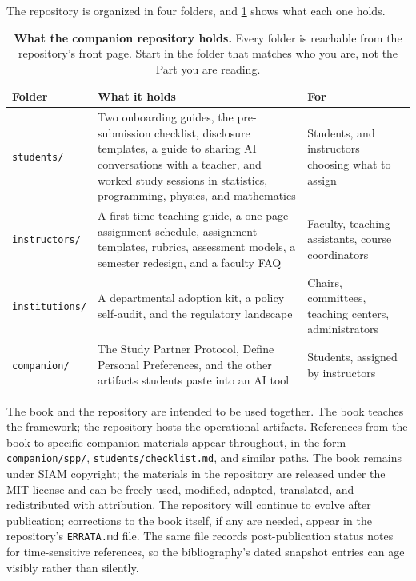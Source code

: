 \documentclass{SIAMbook2023}
\begin{document}
The repository is organized in four folders, and \cref{tab:repo-map} shows what each one holds.

\begin{table}[H]
\centering
\caption{\textbf{What the companion repository holds.} Every folder is reachable from the repository's front page. Start in the folder that matches who you are, not the Part you are reading.}
\label{tab:repo-map}
\begin{tabularx}{\textwidth}{>{\raggedright\arraybackslash}X >{\raggedright\arraybackslash}X >{\raggedright\arraybackslash}X}
\toprule
\textbf{Folder} & \textbf{What it holds} & \textbf{For} \\
\midrule
\texttt{students/} & Two onboarding guides, the pre-submission checklist, disclosure templates, a guide to sharing AI conversations with a teacher, and worked study sessions in statistics, programming, physics, and mathematics & Students, and instructors choosing what to assign \\
\addlinespace
\texttt{instructors/} & A first-time teaching guide, a one-page assignment schedule, assignment templates, rubrics, assessment models, a semester redesign, and a faculty FAQ & Faculty, teaching assistants, course coordinators \\
\addlinespace
\texttt{institutions/} & A departmental adoption kit, a policy self-audit, and the regulatory landscape & Chairs, committees, teaching centers, administrators \\
\addlinespace
\texttt{companion/} & The Study Partner Protocol, Define Personal Preferences, and the other artifacts students paste into an AI tool & Students, assigned by instructors \\
\bottomrule
\end{tabularx}
\end{table}

The book and the repository are intended to be used together. The book teaches the framework; the repository hosts the operational artifacts. References from the book to specific companion materials appear throughout, in the form \texttt{companion/spp/}, \texttt{students/checklist.md}, and similar paths. The book remains under SIAM copyright; the materials in the repository are released under the MIT license and can be freely used, modified, adapted, translated, and redistributed with attribution. The repository will continue to evolve after publication; corrections to the book itself, if any are needed, appear in the repository's \texttt{ERRATA.md} file. The same file records post-publication status notes for time-sensitive references, so the bibliography's dated snapshot entries can age visibly rather than silently.
\end{document}
